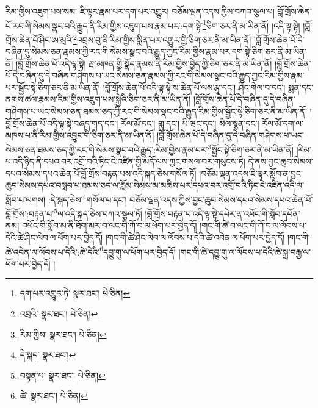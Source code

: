 རིམ་གྱིས་འཇུག་པས་སམ། ཇི་ལྟར་རྣམ་པར་དག་པར་འགྱུར། བཅོམ་ལྡན་འདས་ཀྱིས་བཀའ་སྩལ་པ། བློ་གྲོས་ཆེན་པོ་རང་གི་སེམས་སྣང་བའི་རྒྱུད་ནི་རིམ་གྱིས་འཇུག་པས་རྣམ་པར་:དག་སྟེ་\footnote{དག་པར་འགྱུར་ཏེ་  སྣར་ཐང་།  པེ་ཅིན། }ཅིག་ཅར་ནི་མ་ཡིན་ནོ། །འདི་ལྟ་སྟེ། །བློ་གྲོས་ཆེན་པོ་ཤིང་ཨ་མྲའི་\footnote{འབྲའི་  སྣར་ཐང་།  པེ་ཅིན། }འབྲས་བུ་ནི་རིམ་གྱིས་སྨིན་པར་འགྱུར་གྱི་ཅིག་ཅར་ནི་མ་ཡིན་ནོ། །བློ་གྲོས་ཆེན་པོ་དེ་བཞིན་དུ་སེམས་ཅན་རྣམས་ཀྱི་རང་གི་སེམས་སྣང་བའི་རྒྱུད་ཀྱང་རིམ་གྱིས་རྣམ་པར་དག་སྟེ་ཅིག་ཅར་ནི་མ་ཡིན་ནོ། །བློ་གྲོས་ཆེན་པོ་འདི་ལྟ་སྟེ། རྫ་མཁན་གྱི་སྣོད་རྣམས་ནི་རིམ་གྱིས་བྱེད་ཀྱི་ཅིག་ཅར་ནི་མ་ཡིན་ནོ། །བློ་གྲོས་ཆེན་པོ་དེ་བཞིན་དུ་དེ་བཞིན་གཤེགས་པ་ཡང་སེམས་ཅན་རྣམས་ཀྱི་རང་གི་སེམས་སྣང་བའི་རྒྱུད་ཀྱང་རིམ་གྱིས་རྣམ་པར་སྦྱོང་སྟེ་ཅིག་ཅར་ནི་མ་ཡིན་ནོ། །བློ་གྲོས་ཆེན་པོ་འདི་ལྟ་སྟེ་ས་ཆེན་པོ་ལས་རྩྭ་དང་། ཤིང་གེལ་བ་དང་། སྨན་དང་ནགས་ཚལ་རྣམས་རིམ་གྱིས་འཇུག་པས་སྐྱེའི་ཅིག་ཅར་ནི་མ་ཡིན་ནོ། །བློ་གྲོས་ཆེན་པོ་དེ་བཞིན་དུ་དེ་བཞིན་གཤེགས་པ་ཡང་སེམས་ཅན་ཐམས་ཅད་ཀྱི་རང་གི་སེམས་སྣང་བའི་རྒྱུད་རིམ་གྱིས་སྦྱོང་སྟེ་ཅིག་ཅར་ནི་མ་ཡིན་ནོ། །བློ་གྲོས་ཆེན་པོ་འདི་ལྟ་སྟེ་བཞད་གད་དང་། རོལ་མོ་དང་། གླུ་དང་། པི་ཝང་དང་། སིལ་སྙན་དང་། རོལ་མོ་དག་ལ་མཁས་པ་ནི་རིམ་གྱིས་འབྱུང་གི་ཅིག་ཅར་ནི་མ་ཡིན་ནོ། །བློ་གྲོས་ཆེན་པོ་དེ་བཞིན་དུ་དེ་བཞིན་གཤེགས་པ་ཡང་སེམས་ཅན་ཐམས་ཅད་ཀྱི་རང་གི་སེམས་སྣང་བའི་རྒྱུད་:རིམ་གྱིས་རྣམ་པར་\footnote{རིམ་གྱིས་  སྣར་ཐང་།  པེ་ཅིན། }སྦྱོང་སྟེ་ཅིག་ཅར་ནི་མ་ཡིན་ནོ། །རིམ་པ་འདི་ཉིད་ནི་དཔའ་བར་འགྲོ་བའི་ཏིང་ངེ་འཛིན་གྱི་མདོ་ལས་ཀྱང་གསལ་བར་གསུངས་ཏེ། དེ་ནས་བྱང་ཆུབ་སེམས་དཔའ་སེམས་དཔའ་ཆེན་པོ་བློ་གྲོས་བརྟན་པས་འདི་སྐད་ཅེས་གསོལ་ཏོ། །བཅོམ་ལྡན་འདས་ཇི་ལྟར་སློབ་ན་བྱང་ཆུབ་སེམས་དཔའ་བསླབ་པ་ཐམས་ཅད་ལ་རློམ་སེམས་མ་མཆིས་པར་དཔའ་བར་འགྲོ་བའི་ཏིང་ངེ་འཛིན་འདི་ལ་སློབ་པ་ལགས། :དེ་སྐད་ཅེས་\footnote{དེ་སྐད་  སྣར་ཐང་། }གསོལ་པ་དང་། བཅོམ་ལྡན་འདས་ཀྱིས་བྱང་ཆུབ་སེམས་དཔའ་སེམས་དཔའ་ཆེན་པོ་བློ་གྲོས་:བརྟན་པ་\footnote{བསྟན་པ་  སྣར་ཐང་།  པེ་ཅིན། }ལ་འདི་སྐད་ཅེས་བཀའ་སྩལ་ཏོ། །བློ་གྲོས་བརྟན་པ་འདི་ལྟ་སྟེ་དཔེར་ན་འཕོང་གི་སློབ་དཔོན་ནམ། འཕོང་གི་སློབ་མ་ནི་ཐོག་མར་བ་ལང་གི་ཀོ་བ་ལ་ཕོག་པར་བྱེད་དོ། །གང་གི་ཚེ་བ་ལང་གི་ཀོ་བ་ལ་ལོབས་པ་དེའི་ཚེ་ཤིང་ལེབ་ལ་ཕོག་པར་བྱེད་དོ། །གང་གི་ཚེ་ཤིང་ལེབ་ལ་ལོབས་པ་དེའི་ཚེ་འབེན་ལ་ཕོག་པར་བྱེད་དོ། །གང་གི་ཚེ་འབེན་ལ་ལོབས་པ་དེའི་:ཚེ་དེའི་\footnote{ཚེ་  སྣར་ཐང་།  པེ་ཅིན། }དབྱུ་གུ་ལ་ཕོག་པར་བྱེད་དོ། །གང་གི་ཚེ་དབྱུ་གུ་ལ་ལོབས་པ་དེའི་ཚེ་སྐྲ་བརྒྱ་ལ་ཕོག་པར་བྱེད་དོ། །

